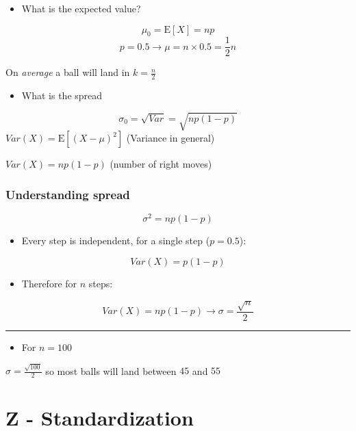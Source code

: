 \documentclass[
  a4paper,
]{scrbook}
\providecommand{\tightlist}{%
  \setlength{\itemsep}{0pt}\setlength{\parskip}{0pt}}\usepackage{longtable,booktabs,array}
\begin{document}
\begin{itemize}
\tightlist
\item
  What is the expected value?
\end{itemize}

\[\mu_0 = \mathrm{E}[X] = np\]
\[p = 0.5 \rightarrow \mu = n \times 0.5 = \frac{1}{2}n\]

On \emph{average} a ball will land in \(k=\frac{n}{2}\)

\begin{itemize}
\tightlist
\item
  What is the spread
\end{itemize}

\[\sigma_0 = \sqrt{Var} = \sqrt{np(1-p)}\]
\(Var(X) = \mathrm{E}[(X-\mu)^2]\) (Variance in general)

\(Var(X) = np(1-p)\) (number of right moves)

\subsubsection{Understanding spread}\label{understanding-spread}

\[\sigma^2=np(1-p)\]

\begin{itemize}
\tightlist
\item
  Every step is independent, for a single step (\(p=0.5\)):
\end{itemize}

\[Var(X) = p(1-p)\]

\begin{itemize}
\tightlist
\item
  Therefore for \(n\) steps:
\end{itemize}

\[Var(X) = np(1-p) \rightarrow \sigma = \frac{\sqrt{n}}{2}\]

\begin{center}\rule{0.5\linewidth}{0.5pt}\end{center}

\begin{itemize}
\tightlist
\item
  For \(n = 100\)
\end{itemize}

\(\sigma = \frac{\sqrt{100}}{2}\) so most balls will land between \(45\)
and \(55\)

\section{Z - Standardization}\label{z---standardization}
\end{document}
